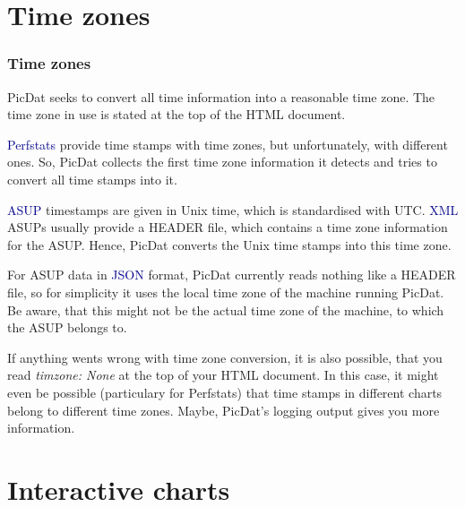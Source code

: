 \documentclass[8pt]{beamer}
\begin{document}
\section{Time zones}
\begin{frame}
\frametitle{Time zones}
PicDat seeks to convert all time information into a reasonable time zone. The time zone in use is stated at the top of the HTML document. 
\bigskip

\textcolor{darkblue}{Perfstats} provide time stamps with time zones, but unfortunately, with different ones. So, PicDat collects the first time zone information it detects and tries to convert all time stamps into it.
\bigskip

\textcolor{darkblue}{ASUP} timestamps are given in Unix time, which is standardised with UTC. \textcolor{darkblue}{XML} ASUPs usually provide a HEADER file, which contains a time zone information for the ASUP. Hence, PicDat converts the Unix time stamps into this time zone.
\bigskip

For ASUP data in \textcolor{darkblue}{JSON} format, PicDat currently reads nothing like a HEADER file, so for simplicity it uses the local time zone of the machine running PicDat. Be aware, that this might not be the actual time zone of the machine, to which the ASUP belongs to.
\bigskip

If anything wents wrong with time zone conversion, it is also possible, that you read \textit{timzone: None} at the top of your HTML document. In this case, it might even be possible (particulary for Perfstats) that time stamps in different charts belong to different time zones. Maybe, PicDat's logging output gives you more information.
\end{frame}


\section{Interactive charts}
\end{document}
